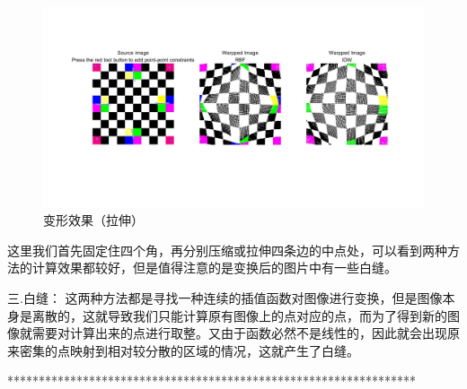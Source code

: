 \documentclass[a4paper]{ltxdoc}
\begin{document}
\begin{figure}[htb]
  \centering
  \includegraphics[width=1.0\textwidth]{fig2.jpg}
  \caption{变形效果（拉伸）}
  \label{fig:fig-1}
\end{figure}

\newpage
这里我们首先固定住四个角，再分别压缩或拉伸四条边的中点处，可以看到两种方法的计算效果都较好，但是值得注意的是变换后的图片中有一些白缝。

三.白缝：
这两种方法都是寻找一种连续的插值函数对图像进行变换，但是图像本身是离散的，这就导致我们只能计算原有图像上的点对应的点，而为了得到新的图像就需要对计算出来的点进行取整。又由于函数必然不是线性的，因此就会出现原来密集的点映射到相对较分散的区域的情况，这就产生了白缝。
















*****************************************************************\\
\end{document}
